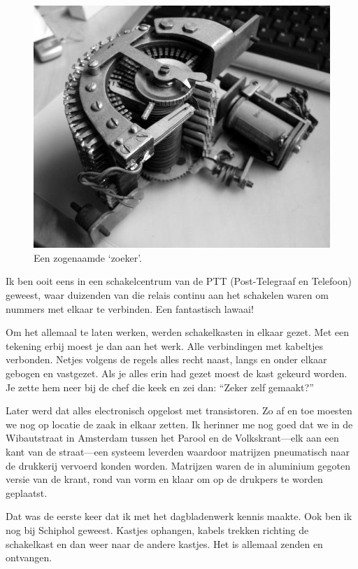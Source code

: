 \documentclass[12pt,twoside, openright]{memoir}
\begin{document}
\begin{figure}
\centering
\includegraphics[width=\textwidth]{img/203relaistelefooncentrale}
\caption*{\footnotesize Een zogenaamde `zoeker'.}
\end{figure}

Ik ben ooit eens in een schakelcentrum van de PTT (Post-Telegraaf en Telefoon) geweest, waar duizenden van die relais continu aan het schakelen waren om nummers met elkaar te verbinden. Een fantastisch lawaai! 

Om het allemaal te laten werken, werden schakelkasten in elkaar gezet. Met een tekening erbij moest je dan aan het werk. Alle verbindingen met kabeltjes verbonden. Netjes volgens de regels alles recht naast, langs en onder elkaar gebogen en vastgezet. Als je alles erin had gezet moest de kast gekeurd worden. Je zette hem neer bij de chef die keek en zei dan: ``Zeker zelf gemaakt?''

Later werd dat alles electronisch opgelost met transistoren. Zo af en toe moesten we nog op locatie de zaak in elkaar zetten. Ik herinner me nog goed dat we in de Wibautstraat in Amsterdam tussen het Parool en de Volkskrant---elk aan een kant van de straat---een systeem leverden waardoor matrijzen pneumatisch naar de drukkerij vervoerd konden worden. Matrijzen waren de in aluminium gegoten versie van de krant, rond van vorm en klaar om op de drukpers te worden geplaatst. 

Dat was de eerste keer dat ik met het dagbladenwerk kennis maakte. Ook ben ik nog bij Schiphol geweest. Kastjes ophangen, kabels trekken richting de schakelkast en dan weer naar de andere kastjes. Het is allemaal zenden en ontvangen. 
\end{document}
